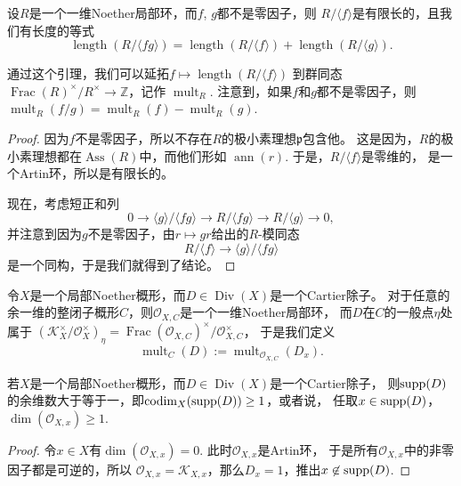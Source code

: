 \begin{lem}
    设$R$是一个一维Noether局部环，而$f$, $g$都不是零因子，则
    $R/\langle f\rangle$是有限长的，且我们有长度的等式
    \[
        \operatorname{length}(R/\langle fg\rangle) =
        \operatorname{length}(R/\langle f\rangle) +
        \operatorname{length}(R/\langle g\rangle).
    \]
\end{lem}
    
通过这个引理，我们可以延拓$f\mapsto \operatorname{length}(R/\langle f\rangle)$
到群同态 $\operatorname{Frac}(R)^\times /R^\times \to \mathbb Z$，记作
$\operatorname{mult}_R$. 注意到，如果$f$和$g$都不是零因子，则
$\operatorname{mult}_R(f/g)=\operatorname{mult}_R(f)-\operatorname{mult}_R(g)$.

\begin{proof}
    因为$f$不是零因子，所以不存在$R$的极小素理想$\mathfrak p$包含他。
    这是因为，$R$的极小素理想都在$\operatorname{Ass}(R)$中，而他们形如
    $\operatorname{ann}(r)$. 于是，$R/\langle f\rangle$是零维的，
    是一个Artin环，所以是有限长的。
    
    现在，考虑短正和列
    \[
        0\to \langle g\rangle /\langle fg\rangle \to 
        R/\langle fg\rangle\to R/\langle g\rangle \to 0,
    \]
    并注意到因为$g$不是零因子，由$r\mapsto gr$给出的$R$-模同态
    \[
        R/\langle f\rangle \to\langle g\rangle/\langle fg\rangle
    \]
    是一个同构，于是我们就得到了结论。
\end{proof}

令$X$是一个局部Noether概形，而$D\in \operatorname{Div}(X)$是一个Cartier除子。
对于任意的余一维的整闭子概形$C$，则$\mathcal O_{X,C}$是一个一维Noether局部环，
而$D$在$C$的一般点$\eta$处属于
$(\mathcal K^\times_X/\mathcal O_X^\times)_\eta=
\operatorname{Frac} (\mathcal O_{X,C})^\times/\mathcal O_{X,C}^\times$，
于是我们定义
\[
    \operatorname{mult}_C(D):= \operatorname{mult}_{\mathcal O_{X,C}}(D_x).
\]

\begin{lem}
若$X$是一个局部Noether概形，而$D\in \operatorname{Div}(X)$是一个Cartier除子，
则$\operatorname{supp}(D)$的余维数大于等于一，即$\operatorname{codim}_X(\operatorname{supp}(D))\geq 1$，或者说，
任取$x\in \operatorname{supp}(D)$，$\dim(\mathcal O_{X,x})\geq 1$.
\end{lem}

\begin{proof}
令$x\in X$有$\dim(\mathcal O_{X,x})=0$. 此时$\mathcal O_{X,x}$是Artin环，
于是所有$\mathcal O_{X,x}$中的非零因子都是可逆的，所以
$\mathcal O_{X,x}=\mathcal K_{X,x}$，那么$D_x=1$，推出$x\not\in \operatorname{supp}(D)$.
\end{proof}


